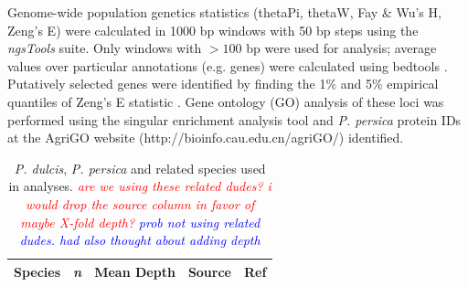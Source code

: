 \documentclass[12pt]{article}
\newcommand{\jri}[1]{\textcolor{red}{\emph{#1}}}
\newcommand{\dv}[1]{\textcolor{blue}{\emph{#1}}}
\begin{document}
Genome-wide population genetics statistics (thetaPi, thetaW, Fay \& Wu's H, Zeng's E) were calculated in 1000 bp windows with 50 bp steps using the \emph{ngsTools} \citep{fumagalli2014ngstools} suite. 
%
Only windows with $>100$ bp were used for analysis; average values over particular annotations (e.g. genes) were calculated using bedtools \citep{quinlan2010bedtools}.
%
Putatively selected genes were identified by finding the 1\% and 5\% empirical quantiles of Zeng's E statistic \citep{zeng2006statistical}.
%
Gene ontology (GO) analysis of these loci was performed using  the singular enrichment analysis tool and \emph{P. persica} protein IDs at the AgriGO website (http://bioinfo.cau.edu.cn/agriGO/) identified.
%
\begin{center}
\begin{longtable}{lccll}
\caption{\emph{P. dulcis}, \emph{P. persica} and related species used in analyses. \jri{are we using these related dudes? i would drop the source column in favor of maybe X-fold depth?} \dv{prob not using related dudes. had also thought about adding depth}} \label{samples} \\
\hline \hline 
\multicolumn{1}{l}{\textbf{Species}} &
\multicolumn{1}{c}{\textbf{\emph{n}}} &
\multicolumn{1}{c}{\textbf{Mean Depth}} &
\multicolumn{1}{l}{\textbf{Source}} &
\multicolumn{1}{l}{\textbf{Ref}}\\
\hline 
\endfirsthead


\end{longtable}
\end{center}
\end{document}

